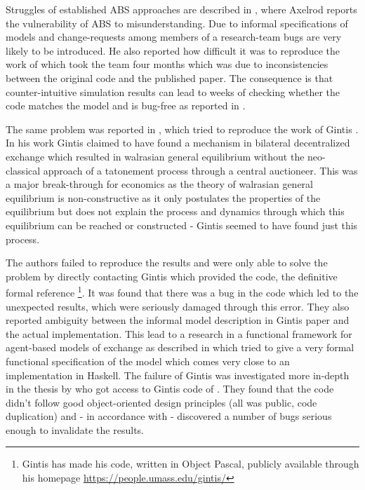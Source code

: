 \bigskip

Struggles of established ABS approaches are described in \cite{axelrod_chapter_2006}, where Axelrod reports the vulnerability of ABS to misunderstanding. Due to informal specifications of models and change-requests among members of a research-team bugs are very likely to be introduced. He also reported how difficult it was to reproduce the work of \cite{axelrod_convergence_1995} which took the team four months which was due to inconsistencies between the original code and the published paper. The consequence is that counter-intuitive simulation results can lead to weeks of checking whether the code matches the model and is bug-free as reported in \cite{axelrod_advancing_1997}.

The same problem was reported in \cite{ionescu_dependently-typed_2012}, which tried to reproduce the work of Gintis \cite{gintis_emergence_2006}. In his work Gintis claimed to have found a mechanism in bilateral decentralized exchange which resulted in walrasian general equilibrium without the neo-classical approach of a tatonement process through a central auctioneer. This was a major break-through for economics as the theory of walrasian general equilibrium is non-constructive as it only postulates the properties of the equilibrium \cite{colell_microeconomic_1995} but does not explain the process and dynamics through which this equilibrium can be reached or constructed - Gintis seemed to have found just this process.

The authors \cite{ionescu_dependently-typed_2012} failed to reproduce the results and were only able to solve the problem by directly contacting Gintis which provided the code, the definitive formal reference \footnote{Gintis has made his code, written in Object Pascal, publicly available through his homepage \url{https://people.umass.edu/gintis/}}. It was found that there was a bug in the code which led to the unexpected results, which were seriously damaged through this error. They also reported ambiguity between the informal model description in Gintis paper and the actual implementation.
This lead to a research in a functional framework for agent-based models of exchange as described in \cite{botta_functional_2011} which tried to give a very formal functional specification of the model which comes very close to an implementation in Haskell. The failure of Gintis was investigated more in-depth in the thesis by \cite{evensen_extensible_2010} who got access to Gintis code of \cite{gintis_emergence_2006}. They found that the code didn't follow good object-oriented design principles (all was public, code duplication) and - in accordance with \cite{ionescu_dependently-typed_2012} - discovered a number of bugs serious enough to invalidate the results. 


